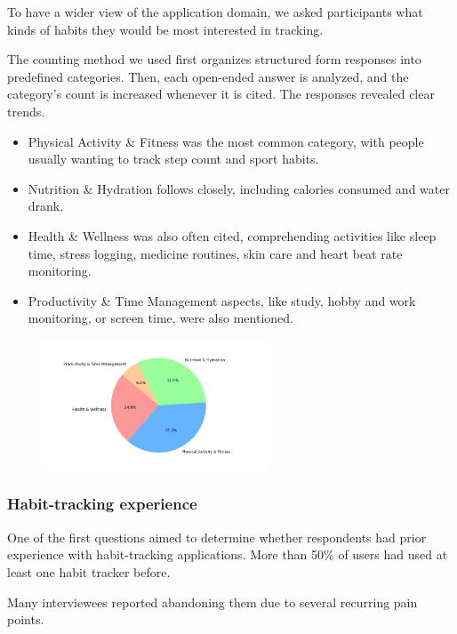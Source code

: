 \documentclass{article}
\begin{document}
To have a wider view of the application domain, we asked participants what kinds of habits they would be most interested in tracking.

\label{parag:stats-method}
The counting method we used first organizes structured form responses into predefined categories.
Then, each open-ended answer is analyzed, and the category’s count is increased whenever it is cited.
The responses revealed clear trends.

\begin{itemize}
	\item Physical Activity \& Fitness was the most common category, with people usually wanting to track step count and sport habits.
	\item Nutrition \& Hydration follows closely, including calories consumed and water drank.
	\item Health \& Wellness was also often cited, comprehending activities like sleep time, stress logging, medicine routines, skin care and heart beat rate monitoring.
	\item Productivity \& Time Management aspects, like study, hobby and work monitoring, or screen time, were also mentioned.
\end{itemize}

\begin{figure}[H]
	\centering
	\includegraphics[width=0.6\textwidth]{images/tracked-categories.png}
\end{figure}

\subsubsection{Habit-tracking experience}

One of the first questions aimed to determine whether respondents had prior experience with habit-tracking applications.
More than 50\% of users had used at least one habit tracker before.

Many interviewees reported abandoning them due to several recurring pain points.
\end{document}
